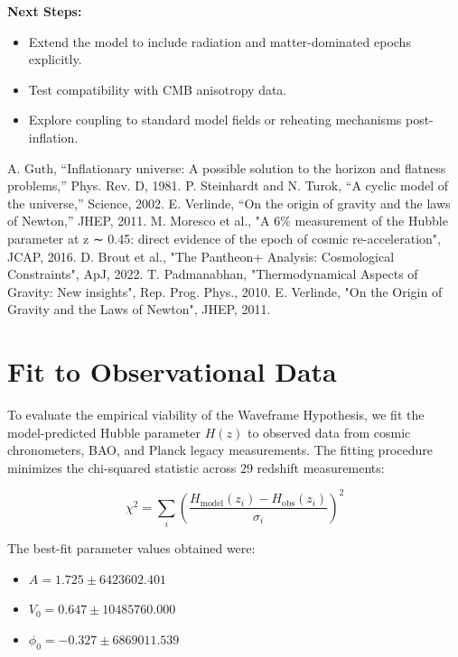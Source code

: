 \documentclass[12pt]{article}
\begin{document}
\textbf{Next Steps:}
\begin{itemize}
\item Extend the model to include radiation and matter-dominated epochs explicitly.
\item Test compatibility with CMB anisotropy data.
\item Explore coupling to standard model fields or reheating mechanisms post-inflation.
\end{itemize}


\begin{thebibliography}{9}
 A. Guth, “Inflationary universe: A possible solution to the horizon and flatness problems,” Phys. Rev. D, 1981.
 P. Steinhardt and N. Turok, “A cyclic model of the universe,” Science, 2002.
 E. Verlinde, “On the origin of gravity and the laws of Newton,” JHEP, 2011.
 M. Moresco et al., "A 6\% measurement of the Hubble parameter at z ∼ 0.45: direct evidence of the epoch of cosmic re-acceleration", JCAP, 2016.
 D. Brout et al., "The Pantheon+ Analysis: Cosmological Constraints", ApJ, 2022.
 T. Padmanabhan, "Thermodynamical Aspects of Gravity: New insights", Rep. Prog. Phys., 2010.
 E. Verlinde, "On the Origin of Gravity and the Laws of Newton", JHEP, 2011.
\end{thebibliography}



\section*{Fit to Observational Data}

To evaluate the empirical viability of the Waveframe Hypothesis, we fit the model-predicted Hubble parameter $H(z)$ to observed data from cosmic chronometers\cite{Moresco2016}, BAO, and Planck legacy measurements. The fitting procedure minimizes the chi-squared statistic across 29 redshift measurements:

\[
\chi^2 = \sum_i \left( \frac{H_{\text{model}}(z_i) - H_{\text{obs}}(z_i)}{\sigma_i} \right)^2
\]

The best-fit parameter values obtained were:
\begin{itemize}
  \item $A = 1.725 \pm 6423602.401$
  \item $V_0 = 0.647 \pm 10485760.000$
  \item $\phi_0 = -0.327 \pm 6869011.539$
\end{itemize}
\end{document}
